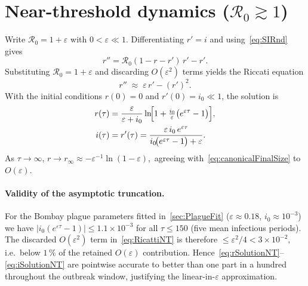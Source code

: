 \documentclass[11pt]{article}
\newcommand{\RR}{\mathcal{R}_0}
\begin{document}
\section{Near-threshold dynamics (\texorpdfstring{$\RR\gtrsim 1$}{R0≈1})}
\label{sec:NearThreshold}

Write $\RR = 1+\varepsilon$ with $0<\varepsilon\ll1$.
Differentiating $r'=i$ and using~\cref{eq:SIRnd} gives
\[
r'' = \RR (1-r-r')\,r' - r'.
\]
Substituting $\RR=1+\varepsilon$ and discarding $O(\varepsilon^2)$ terms
yields the Riccati equation
\begin{equation}\label{eq:RicattiNT}
  r'' \;\approx\; \varepsilon\,r' - (r')^2 .
\end{equation}
With the initial conditions $r(0)=0$ and $r'(0)=i_0\ll1$,
the solution is
\begin{align}
r(\tau) &=
  \frac{\varepsilon}{\varepsilon+i_0}
  \ln\!\Bigl[1+\tfrac{i_0}{\varepsilon}\bigl(e^{\varepsilon\tau}-1\bigr)\Bigr],
\label{eq:rSolutionNT}\\
i(\tau)&=r'(\tau)=
  \frac{\varepsilon\,i_0\,e^{\varepsilon\tau}}
       {i_0\!\bigl(e^{\varepsilon\tau}-1\bigr)+\varepsilon}.
\label{eq:iSolutionNT}
\end{align}
As $\tau\to\infty$,
\(
r\to r_\infty \approx -\varepsilon^{-1}\ln(1-\varepsilon),
\)
agreeing with~\cref{eq:canonicalFinalSize} to $O(\varepsilon)$.

\paragraph{Validity of the asymptotic truncation.}
For the Bombay plague parameters fitted in~\cref{sec:PlagueFit}
($\varepsilon\approx0.18$, $i_0\approx10^{-3}$) we have
\(
|i_0(e^{\varepsilon\tau}-1)|\le1.1\times10^{-3}
\)
for all $\tau\le150$ (five mean infectious periods).  The discarded
$O(\varepsilon^2)$ term in~\eqref{eq:RicattiNT} is therefore
\(
\le\varepsilon^2/4<3\times10^{-2},
\)
i.e.\ below $1\,\%$ of the retained $O(\varepsilon)$ contribution.
Hence~\eqref{eq:rSolutionNT}–\eqref{eq:iSolutionNT} are pointwise
accurate to better than one part in a hundred throughout the outbreak
window, justifying the linear-in-$\varepsilon$ approximation.

\end{document}
